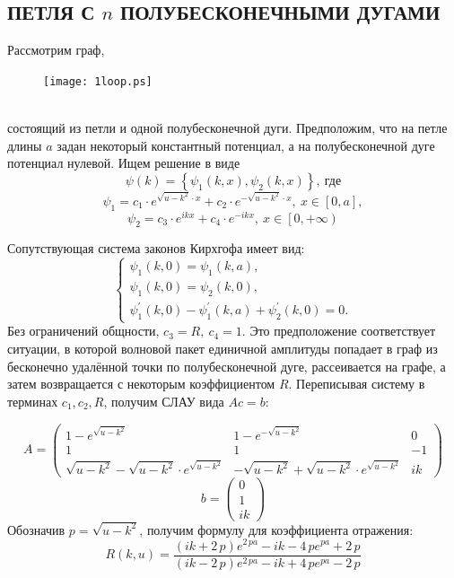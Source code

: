 \documentclass[a4 paper, 12 pt]{extarticle}
\begin{document}
   \subsection{ПЕТЛЯ С $n$ ПОЛУБЕСКОНЕЧНЫМИ ДУГАМИ}
   Рассмотрим граф,
   \begin{figure}[!htb]
   	\centering
   	\texttt{[image: 1loop.ps]}
   \end{figure}
   \\состоящий из петли и одной полубесконечной дуги. Предположим, что на петле длины $a$ задан некоторый константный потенциал, а на полубесконечной дуге потенциал нулевой.
   Ищем решение в виде
   \[\psi\left(k\right) = \left\{\psi_1\left(k,x\right), \psi_2\left(k,x\right)\right\}, \ \text{где}\]
   \[
   \psi_1 = c_1\cdot e^{\sqrt{u-k^2} \cdot x} + c_2\cdot e^{-\sqrt{u-k^2} \cdot x}, \ x \in \left[0,a\right],\]
   \[\psi_2 = c_3 \cdot e^{ikx}+c_4 \cdot e^{-ikx}, \ x \in \left[0,+\infty\right)\]
   
   Сопутствующая система законов Кирхгофа имеет вид:
   \[\begin{cases}
   \psi_1\left(k,0\right)=\psi_1\left(k,a\right), \\
   \psi_{1}\left(k,0\right)=\psi_2\left(k,0\right), \\
   \psi_1^\prime\left(k,0\right)-\psi_1^\prime\left(k,a\right)+\psi_2^\prime\left(k,0\right)=0.
   \end{cases}
   \]
   Без ограничений общности, $c_3=R, \ c_4 = 1$. Это предположение соответствует ситуации, в которой волновой пакет единичной амплитуды попадает в граф из бесконечно удалённой точки по полубесконечной дуге, рассеивается на графе, а затем возвращается с некоторым коэффициентом $R$. Переписывая систему в терминах $c_1,c_2,R$, получим СЛАУ вида $Ac=b$:
   
   \[ A = \left(\begin{smallmatrix}
   1-e^{\sqrt{u-k^2}} & 1-e^{-\sqrt{u-k^2}} & 0 \\
   1 & 1 & -1 \\
   \sqrt{u-k^2}-\sqrt{u-k^2} \cdot e^{\sqrt{u-k^2}} & -\sqrt{u-k^2}+\sqrt{u-k^2} \cdot e^{\sqrt{u-k^2}} & ik
   \end{smallmatrix}\right)\]
   \[b = \left(\begin{smallmatrix}
   0 \\
   1 \\
   ik
   \end{smallmatrix}\right)
   \]
   Обозначив $p=\sqrt{u-k^2}$, получим формулу для коэффициента отражения:
   \begin{equation}
   R\left(k,u\right) = {\frac { \left( ik+2\,p \right) {e}^{2\,pa}-ik-4\,p{e}^{pa}+2\,p}{ \left( ik-2\,p \right) {e}^{2\,pa}-ik+4\,p{e}^{pa}-2\,p}}
   \end{equation}
     
\end{document}
